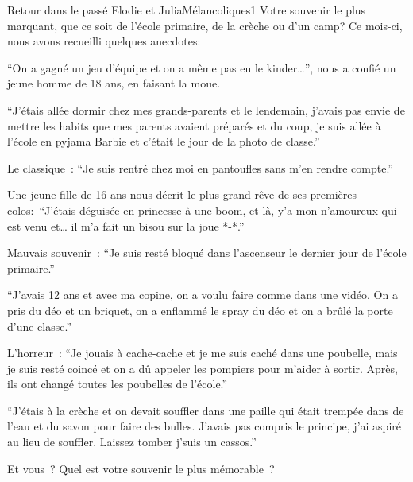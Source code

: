 \documentclass{parch}
\begin{document}
	\newpage
	
	\begin{parchArticle}{Retour dans le passé}
		{Elodie et Julia}{Mélancoliques}{1}
		\noindent Votre souvenir le plus marquant, que ce soit de l’école primaire, de la crèche ou d’un camp? Ce mois-ci, nous avons recueilli quelques anecdotes:
		
		\enquote{On a gagné un jeu d’équipe et on a même pas eu le kinder…}, nous a confié un jeune homme de 18 ans, en faisant la moue.
		
		\enquote{J’étais allée dormir chez mes grands-parents et le lendemain, j’avais pas envie de mettre les habits que mes parents avaient préparés et du coup, je suis allée à l’école en pyjama Barbie et c’était le jour de la photo de classe.}
		
		Le classique : \enquote{Je suis rentré chez moi en pantoufles sans m’en rendre compte.}
		
		Une jeune fille de 16 ans nous décrit le plus grand rêve de ses premières colos: \enquote{J’étais déguisée en princesse à une boom, et là, y’a mon n’amoureux qui est venu et… il m’a fait un bisou sur la joue *-*.}
		
		Mauvais souvenir : \enquote{Je suis resté bloqué dans l’ascenseur le dernier jour de l’école primaire.}
		
		\enquote{J’avais 12 ans et avec ma copine, on a voulu faire comme dans une vidéo. On a pris du déo et un briquet, on a enflammé le spray du déo et on a brûlé la porte d’une classe.}
		
		L’horreur : \enquote{Je jouais à cache-cache et je me suis caché dans une poubelle, mais je suis resté coincé et on a dû appeler les pompiers pour m’aider à sortir. Après, ils ont changé toutes les poubelles de l’école.}
		
		\enquote{J’étais à la crèche et on devait souffler dans une paille qui était trempée dans de l’eau et du savon pour faire des bulles. J’avais pas compris le principe, j’ai aspiré au lieu de souffler. Laissez tomber j’suis un cassos.}
		
		Et vous ? Quel est votre souvenir le plus mémorable ?
	\end{parchArticle}
	
\end{document}
